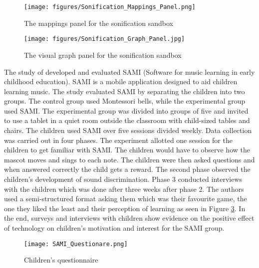 \begin{figure}[H]
    \centering
    \texttt{[image: figures/Sonification\_Mappings\_Panel.png]}
    \caption{The mappings panel for the sonification sandbox \protect\cite{walker2003sonification}}
    \label{fig:Sonification_Mappings_Panel}
\end{figure}

\begin{figure}[H]
    \centering
    \texttt{[image: figures/Sonification\_Graph\_Panel.jpg]}
    \caption{The visual graph panel for the sonification sandbox \protect\cite{walker2003sonification}}
    \label{fig:Sonification_Graph_Panel}
\end{figure}

\newpage

The study of  developed and evaluated SAMI (Software for music learning in early childhood education). SAMI is a mobile application designed to aid children learning music. The study evaluated SAMI by separating the children into two groups. The control group used Montessori bells, while the experimental group used SAMI. The experimental group was divided into groups of five  and invited to use a tablet in a quiet room outside the classroom with child-sized tables and chairs. The children used SAMI over five sessions divided weekly. Data collection was carried out in four phases. The experiment allotted one session for the children to get familiar with SAMI. The children would have to observe how the mascot moves and sings to each note. The children were then asked questions and when answered correctly the child gets a reward. The second phase observed the children's development of sound discrimination. Phase 3 conducted interviews with the children which was done after three weeks after phase 2. The authors used a semi-structured format asking them which was their favourite game, the one they liked the least and their perception of learning as seen in Figure \ref{fig:children_questionnaire}. In the end, surveys and interviews with children show evidence on the positive effect of technology on children’s motivation and interest for the SAMI group.
\begin{figure}[H]
    \centering
    \texttt{[image: SAMI\_Questionare.png]}
    \caption{Children's questionnaire \protect\cite{paule2017music}} 
    \label{fig:children_questionnaire}
\end{figure}

